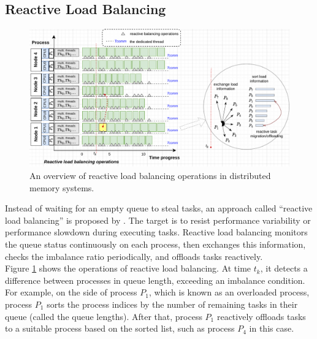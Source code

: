 \subsection{Reactive Load Balancing}
\label{subsec:reactlb_relatedwork}

\begin{figure}[t]
	\centering
	\includegraphics[scale=0.65]{./pictures/preliminaries/preli_reactive_lb_behavior.pdf}
	\caption{An overview of reactive load balancing operations in distributed memory systems.}
	\label{fig:preli_reactlb_operations}
\end{figure}

Instead of waiting for an empty queue to steal tasks, an approach called ``reactive load balancing'' is proposed by \cite{Klinkenberg2020ChameleonReactLB}. The target is to resist performance variability or performance slowdown during executing tasks. Reactive load balancing monitors the queue status continuously on each process, then exchanges this information, checks the imbalance ratio periodically, and offloads tasks reactively.\\

Figure \ref{fig:preli_reactlb_operations} shows the operations of reactive load balancing. At time $t_{k}$, it detects a difference between processes in queue length, exceeding an imbalance condition. For example, on the side of process $P_{1}$, which is known as an overloaded process, process $P_{1}$ sorts the process indices by the number of remaining tasks in their queue (called the queue lengths). After that, process $P_{1}$ reactively offloads tasks to a suitable process based on the sorted list, such as process $P_{4}$ in this case.\\

